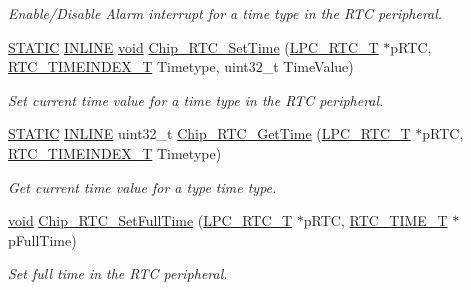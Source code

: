 \begin{DoxyCompactItemize}
\begin{DoxyCompactList}\small\item\em Enable/\-Disable Alarm interrupt for a time type in the R\-T\-C peripheral. \end{DoxyCompactList}\item 
\hyperlink{group__LPC__Types__Public__Macros_ga10b2d890d871e1489bb02b7e70d9bdfb}{S\-T\-A\-T\-I\-C} \hyperlink{group__LPC__Types__Public__Types_ga2eb6f9e0395b47b8d5e3eeae4fe0c116}{I\-N\-L\-I\-N\-E} \hyperlink{Paradigm_2Tern__EE_2small_2portmacro_8h_a14d32f8130d3c0b212cfc751730b5b49}{void} \hyperlink{group__RTC__17XX__40XX_ga8104b580aeb00a3d5a9e325b3162b1bb}{Chip\-\_\-\-R\-T\-C\-\_\-\-Set\-Time} (\hyperlink{structLPC__RTC__T}{L\-P\-C\-\_\-\-R\-T\-C\-\_\-\-T} $\ast$p\-R\-T\-C, \hyperlink{group__RTC__17XX__40XX_ga8144898fe628404d396db06dc8aac0e0}{R\-T\-C\-\_\-\-T\-I\-M\-E\-I\-N\-D\-E\-X\-\_\-\-T} Timetype, uint32\-\_\-t Time\-Value)
\begin{DoxyCompactList}\small\item\em Set current time value for a time type in the R\-T\-C peripheral. \end{DoxyCompactList}\item 
\hyperlink{group__LPC__Types__Public__Macros_ga10b2d890d871e1489bb02b7e70d9bdfb}{S\-T\-A\-T\-I\-C} \hyperlink{group__LPC__Types__Public__Types_ga2eb6f9e0395b47b8d5e3eeae4fe0c116}{I\-N\-L\-I\-N\-E} uint32\-\_\-t \hyperlink{group__RTC__17XX__40XX_ga661c73c8fce7243b30a207ad7cbee59b}{Chip\-\_\-\-R\-T\-C\-\_\-\-Get\-Time} (\hyperlink{structLPC__RTC__T}{L\-P\-C\-\_\-\-R\-T\-C\-\_\-\-T} $\ast$p\-R\-T\-C, \hyperlink{group__RTC__17XX__40XX_ga8144898fe628404d396db06dc8aac0e0}{R\-T\-C\-\_\-\-T\-I\-M\-E\-I\-N\-D\-E\-X\-\_\-\-T} Timetype)
\begin{DoxyCompactList}\small\item\em Get current time value for a type time type. \end{DoxyCompactList}\item 
\hyperlink{Paradigm_2Tern__EE_2small_2portmacro_8h_a14d32f8130d3c0b212cfc751730b5b49}{void} \hyperlink{group__RTC__17XX__40XX_ga501471295a030ca2dc2872577367073e}{Chip\-\_\-\-R\-T\-C\-\_\-\-Set\-Full\-Time} (\hyperlink{structLPC__RTC__T}{L\-P\-C\-\_\-\-R\-T\-C\-\_\-\-T} $\ast$p\-R\-T\-C, \hyperlink{structRTC__TIME__T}{R\-T\-C\-\_\-\-T\-I\-M\-E\-\_\-\-T} $\ast$p\-Full\-Time)
\begin{DoxyCompactList}\small\item\em Set full time in the R\-T\-C peripheral. \end{DoxyCompactList}\item 

\end{DoxyCompactItemize}
